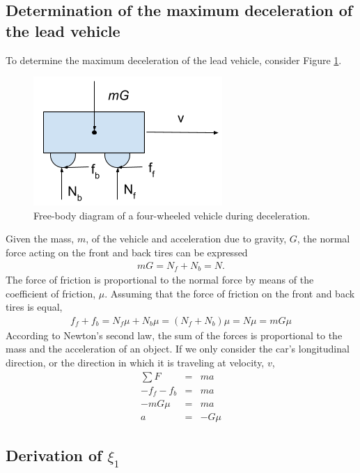 \documentclass[conference]{IEEEtran}
\begin{document}
\onecolumn
\begin{appendix}

\subsection{Determination of the maximum deceleration of the lead vehicle}
To determine the maximum deceleration of the lead vehicle, consider Figure \ref{fig3}.

\begin{figure}[htbp]
\centerline{\includegraphics[width=2.00 in]{maxDecel.png}}
\caption{Free-body diagram of a four-wheeled vehicle during deceleration.}
\label{fig3}
\end{figure}

Given the mass, $m$, of the vehicle and acceleration due to gravity, $G$, the normal force acting on the front and back tires can be expressed
\begin{eqnarray*}
mG=N_f+N_b=N.
\end{eqnarray*}
The force of friction is proportional to the normal force by means of the coefficient of friction, $\mu$. Assuming that the force of friction on the front and back tires is equal,
\begin{eqnarray*}
f_f+f_b=N_f\mu+N_b\mu=(N_f+N_b)\mu=N\mu=mG\mu
\end{eqnarray*}
According to Newton's second law, the sum of the forces is proportional to the mass and the acceleration of an object. If we only consider the car's longitudinal direction, or the direction in which it is traveling at velocity, $v$,
\begin{eqnarray*}
\sum F &=& ma \\
-f_f-f_b &=& ma \\
-mG\mu &=& ma \\
a &=& -G\mu
\end{eqnarray*}




\subsection{Derivation of $\xi_1$}


\end{appendix}
\end{document}
